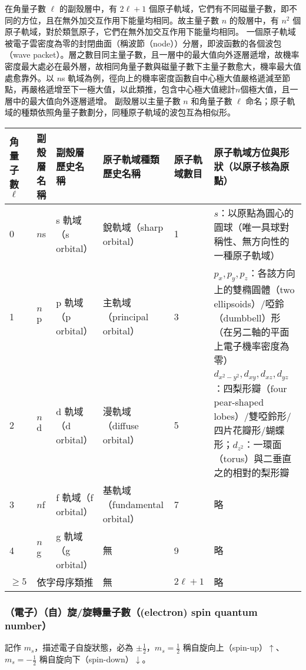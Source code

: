 \documentclass[a4paper,12pt]{report}
\begin{document}
在角量子數 $\ell$ 的副殼層中，有 $2\ell+1$ 個原子軌域，它們有不同磁量子數，即不同的方位，且在無外加交互作用下能量均相同。故主量子數 $n$ 的殼層中，有 $n^2$ 個原子軌域，對於類氫原子，它們在無外加交互作用下能量均相同。
一個原子軌域被電子雲密度為零的封閉曲面（稱波節（node））分層，即波函數的各個波包（wave packet）。層之數目同主量子數，且一層中的最大值向外逐層遞增，故機率密度最大處必在最外層，故相同角量子數與磁量子數下主量子數愈大，機率最大值處愈靠外。以 $n$s 軌域為例，徑向上的機率密度函數自中心極大值嚴格遞減至節點，再嚴格遞增至下一極大值，以此類推，包含中心極大值總計$n$個極大值，且一層中的最大值向外逐層遞增。
\bctf{}\efct
\bctf{}\efct
副殼層以主量子數 $n$ 和角量子數 $\ell$ 命名；原子軌域的種類依照角量子數劃分，同種原子軌域的波包互為相似形。
\begin{longtable}[c]{|p{}|p{}|p{}|p{}|p{}|p{}|}
\hline
角量子數 $\ell$ & 副殼層名稱 & 副殼層歷史名稱 & 原子軌域種類歷史名稱 & 原子軌域數目 & 原子軌域方位與形狀（以原子核為原點） \\\hline
\endhead
0 & $n$s & s 軌域（s orbital） & 銳軌域（sharp orbital）  & 1 & $s$：以原點為圓心的圓球（唯一具球對稱性、無方向性的一種原子軌域） \\\hline
1 & $n$p & p 軌域（p orbital） & 主軌域（principal orbital） & 3 & $p_x,p_y,p_z$：各該方向上的雙橢圓體（two ellipsoids）/啞鈴（dumbbell）形（在另二軸的平面上電子機率密度為零） \\\hline
2 & $n$d & d 軌域（d orbital） & 漫軌域（diffuse orbital） & 5 & $d_{x^2-y^2},d_{xy},d_{xz},d_{yz}$：四梨形瓣（four pear-shaped lobes）/雙啞鈴形/四片花瓣形/蝴蝶形；$d_{z^2}$：一環面（torus）與二垂直之的相對的梨形瓣 \\\hline
3 & $n$f & f 軌域（f orbital） & 基軌域（fundamental orbital） & 7 & 略 \\\hline
4 & $n$g & g 軌域（g orbital） & 無 & 9 & 略 \\\hline
$\geq 5$ & \multicolumn{2}{|c|}{依字母序類推} & 無 & $2\ell+1$ & 略 \\\hline
\end{longtable}\FloatBarrier
\subsubsection{（電子）（自）旋/旋轉量子數（(electron) spin quantum number）}
記作 $m_s$，描述電子自旋狀態，必為 $\pm \frac{1}{2}$，$m_s=\frac{1}{2}$ 稱自旋向上（spin-up）$\uparrow$、$m_s=-\frac{1}{2}$ 稱自旋向下（spin-down）$\downarrow$。
\end{document}
